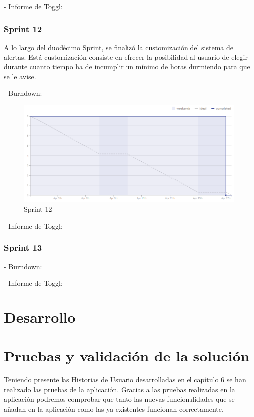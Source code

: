 \documentclass[11pt,openany]{book}
\begin{document}
- Informe de Toggl:

\subsection{Sprint 12}

A lo largo del duodécimo Sprint, se finalizó la customización del sistema de alertas. Está customización consiste en ofrecer la posibilidad al usuario de elegir durante cuanto tiempo ha de incumplir un mínimo de horas durmiendo para que se le avise.

- Burndown:

\begin{figure}[H]
\centering
\includegraphics[totalheight=7cm]{burndowns/Sprint12.png}
\caption{Sprint 12}
\end{figure}

- Informe de Toggl:

\subsection{Sprint 13}

- Burndown:

- Informe de Toggl:

\chapter{Desarrollo}


\chapter{Pruebas y validación de la solución}

Teniendo presente las Historias de Usuario desarrolladas en el capítulo 6 se han realizado las pruebas de la aplicación. Gracias a las pruebas realizadas en la aplicación podremos comprobar que tanto las nuevas funcionalidades que se añadan en la aplicación como las ya existentes funcionan correctamente.
\end{document}
